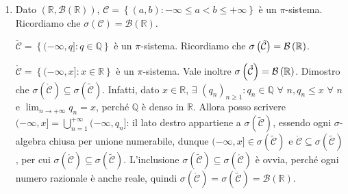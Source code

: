 \documentclass{article}
\begin{document}
\begin{enumerate}
\item Dato $\left( 
\mathbb{R}
,\mathcal{B}\left( 
\mathbb{R}
\right) \right) $, $\mathcal{C=}\left\{ \left( a,b\right) :-\infty \leq
a<b\leq +\infty \right\} $ \`{e} un $\pi $-sistema. Ricordiamo che $\sigma
\left( \mathcal{C}\right) =\mathcal{B}\left( 
\mathbb{R}
\right) $.

$\mathcal{\tilde{C}=}\left\{ (-\infty ,q]:q\in 
\mathbb{Q}
\right\} $ \`{e} un $\pi $-sistema. Ricordiamo che $\sigma \left( \mathcal{%
\tilde{C}}\right) =\mathcal{B}\left( 
\mathbb{R}
\right) $.

$\mathcal{\mathring{C}=}\left\{ (-\infty ,x]:x\in 
\mathbb{R}
\right\} $ \`{e} un $\pi $-sistema. Vale inoltre $\sigma \left( \mathcal{%
\mathring{C}}\right) =\mathcal{B}\left( 
\mathbb{R}
\right) $. Dimostro che $\sigma \left( \mathcal{\mathring{C}}\right)
\subseteq \sigma \left( \mathcal{\tilde{C}}\right) $. Infatti, dato $x\in 
\mathbb{R}
$, $\exists $ $\left( q_{n}\right) _{n\geq 1}:q_{n}\in 
\mathbb{Q}
$ $\forall $ $n,q_{n}\leq x$ $\forall $ $n$ e $\lim_{n\rightarrow +\infty
}q_{n}=x$, perch\'{e} $%
\mathbb{Q}
$ \`{e} denso in $%
\mathbb{R}
$. Allora posso scrivere $(-\infty ,x]=\bigcup_{n=1}^{+\infty }(-\infty
,q_{n}]$: il lato destro appartiene a $\sigma \left( \mathcal{\tilde{C}}%
\right) $, essendo ogni $\sigma $-algebra chiusa per unione numerabile,
dunque $(-\infty ,x]\in \sigma \left( \mathcal{\tilde{C}}\right) $ e $%
\mathcal{\mathring{C}}\subseteq \sigma \left( \mathcal{\tilde{C}}\right) $,
per cui $\sigma \left( \mathcal{\mathring{C}}\right) \subseteq \sigma \left( 
\mathcal{\tilde{C}}\right) $. L'inclusione $\sigma \left( \mathcal{\tilde{C}}%
\right) \subseteq \sigma \left( \mathcal{\mathring{C}}\right) $ \`{e} ovvia,
perch\'{e} ogni numero razionale \`{e} anche reale, quindi $\sigma \left( 
\mathcal{\mathring{C}}\right) =\sigma \left( \mathcal{\tilde{C}}\right) =%
\mathcal{B}\left( 
\mathbb{R}
\right) $.
\end{enumerate}
\end{document}

